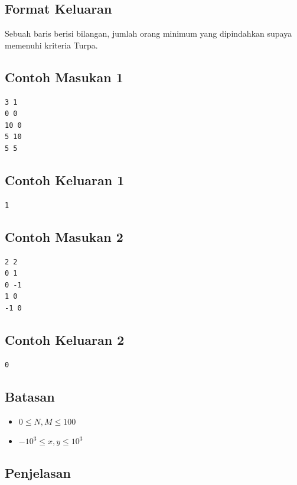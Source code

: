 \documentclass{article}
\begin{document}
\subsection*{Format Keluaran}

\par\noindent Sebuah baris berisi bilangan, jumlah orang minimum yang dipindahkan supaya memenuhi kriteria Turpa.

\subsection*{Contoh Masukan 1}

\begin{lstlisting}
3 1
0 0
10 0
5 10
5 5
\end{lstlisting}

\subsection*{Contoh Keluaran 1}

\begin{lstlisting}
1
\end{lstlisting}

\subsection*{Contoh Masukan 2}

\begin{lstlisting}
2 2
0 1
0 -1
1 0
-1 0
\end{lstlisting}

\subsection*{Contoh Keluaran 2}

\begin{lstlisting}
0
\end{lstlisting}

\subsection*{Batasan}

\begin{itemize}
  \item $0 \leq N,M \leq 100$
  \item $-10^3 \leq x, y \leq 10^3$
\end{itemize}

\subsection*{Penjelasan}
\end{document}
